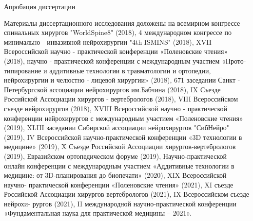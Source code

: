 

        Апробация диссертации


        Материалы диссертационного исследования доложены на всемирном
конгрессе спинальных хирургов "WorldSpine8" (2018), 4 международном
конгрессе по минимально - инвазивной нейрохирургии "4th ISMINS" (2018), XVII
Всероссийской научно - практической конференции «Поленовские чтения»
(2018), научно - практической конференции с международным участием «Прото-
типирование     и   аддитивные   технологии   в   травматологии   и   ортопедии,
нейрохирургии и челюстно - лицевой хирургии» (2018), 671 заседании Санкт -
Петербургской ассоциации нейрохирургов им.Бабчина (2018), IX Съезде
Российской Ассоциации хирургов - вертебрологов (2018), VIII Всероссийском
съезде нейрохирургов (2018), XVIII Всероссийской научно - практической
конференции нейрохирургов с международным участием «Поленовские чтения»
(2019), XLIII заседании Сибирской ассоциации нейрохирургов "СибНейро"(2019),
IV Всероссийской научно-практической конференции «3D технологии в
медицине» (2019), X Съезде Российской Ассоциации хирургов-вертебрологов
(2019), Евразийском ортопедическом форуме (2019), Научно-практической
онлайн конференции с международным участием «Аддитивные технологии в
медицине: от 3D-планирования до биопечати» (2020), XIX Всероссийской научно-
практической конференции «Поленовские чтения» (2021), XI съезде Российской
Ассоциации хирургов-вертебрологов (2021), IX Всероссийском съезде нейрохи-
рургов   (2021),   II   международной   научно-практической    конференции
«Фундаментальная наука для практической медицины – 2021».



